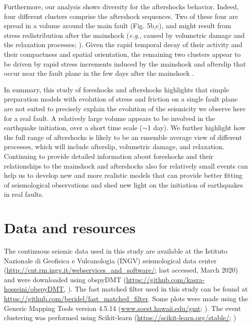 \documentclass[a4paper,12pt,twoside]{article}
\begin{document}
Furthermore, our analysis shows diversity for the aftershocks behavior. Indeed, four different clusters comprise the aftershock sequences. Two of these four are spread in a volume around the main fault (Fig. 5b,c), and might result from stress redistribution after the mainshock (\emph{e.g.}, caused by volumetric damage and the relaxation processes; \cite{trugman2020imaging}). Given the rapid temporal decay of their activity and their compactness and spatial orientation, the remaining two clusters appear to be driven by rapid stress increments induced by the mainshock and afterslip that occur near the fault plane in the few days after the mainshock \citep{Stein_1983_HVE, Shen_1994_PDF}.

In summary, this study of foreshocks and aftershocks highlights that simple preparation models with evolution of stress and friction on a single fault plane are not suited to precisely explain the evolution of the seismicity we observe here for a real fault. A relatively large volume appears to be involved in the earthquake initiation, over a short time scale ($\sim$1 day). We further highlight how the full range of aftershocks is likely to be an ensemble average view of different processes, which will include afterslip, volumetric damage, and relaxation. Continuing to provide detailed information about foreshocks and their relationships to the mainshock and aftershocks also for relatively small events can help us to develop new and more realistic models that can provide better fitting of seismological observations and shed new light on the initiation of earthquakes in real faults.


\section*{Data and resources}

The continuous seismic data used in this study are available at the Istituto Nazionale di Geofisica e Vulcanologia (INGV) seismological data center (\href{http://cnt.rm.ingv.it/webservices_and_software/}{\color{blue}http://cnt.rm.ingv.it/webservices\_and\_software/}; last accessed, March 2020) and were downloaded using obspyDMT (\href{https://github.com/kasra-hosseini/obspyDMT}{\color{blue}https://github.com/kasra-hosseini/obspyDMT}, \cite{Hosseini_2017_obspyDMT}). The fast matched filter \citep{Beauce_2017_FMF} used in this study can be found at \href{https://github.com/beridel/fast_matched_filter}{\color{blue}https://github.com/beridel/fast\_matched\_filter}. Some plots were made using the Generic Mapping Tools version 4.5.14 (\href{www.soest.hawaii.edu/gmt}{\color{blue}www.soest.hawaii.edu/gmt}; \cite{Wessel_1998_NIV}). The event clustering was performed using Scikit-learn (\href{https://scikit-learn.org/stable/}{https://scikit-learn.org/stable/}; \cite{scikit-learn})
\end{document}
